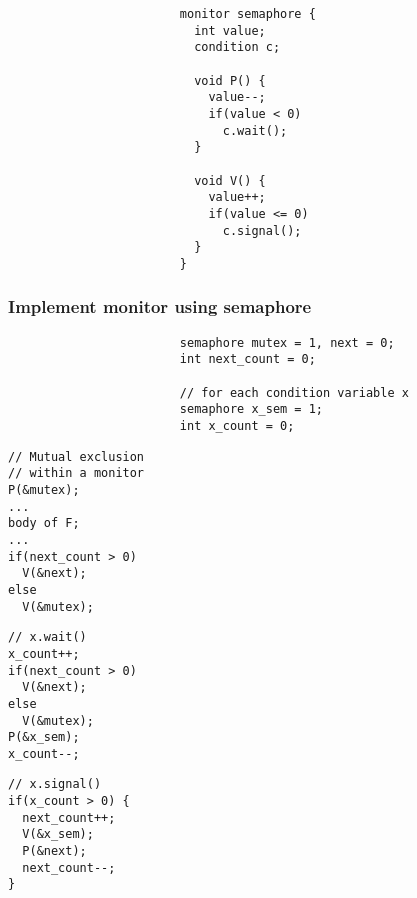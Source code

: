 \documentclass[CJKutf8,dvipsnames,table]{beamer}
\begin{document}
\begin{CJK*}{UTF8}{song}
\begin{frame}[fragile]
\begin{lstlisting}
                        monitor semaphore {
                          int value;
                          condition c;

                          void P() {
                            value--;
                            if(value < 0)
                              c.wait();
                          }

                          void V() {
                            value++;
                            if(value <= 0)
                              c.signal();
                          }
                        }
\end{lstlisting}

\end{frame}

  \begin{frame}[fragile]
  \frametitle{Implement monitor using semaphore} \pause

\begin{lstlisting}
                        semaphore mutex = 1, next = 0;
                        int next_count = 0;

                        // for each condition variable x
                        semaphore x_sem = 1;
                        int x_count = 0;
\end{lstlisting} \pause

  \begin{minipage}[c]{0.4\textwidth}

\begin{lstlisting}
// Mutual exclusion
// within a monitor
P(&mutex);
...
body of F;
...
if(next_count > 0)
  V(&next);
else
  V(&mutex);
\end{lstlisting}
    \pause

  \end{minipage}%
  \begin{minipage}[c]{0.3\textwidth}

\begin{lstlisting}
// x.wait()
x_count++;
if(next_count > 0)
  V(&next);
else
  V(&mutex);
P(&x_sem);
x_count--;
\end{lstlisting}

    \pause

  \end{minipage}%
  \begin{minipage}[c]{0.3\textwidth}
\begin{lstlisting}
// x.signal()
if(x_count > 0) {
  next_count++;
  V(&x_sem);
  P(&next);
  next_count--;
}
\end{lstlisting}


\end{minipage}
\end{frame}
\end{CJK*}
\end{document}
